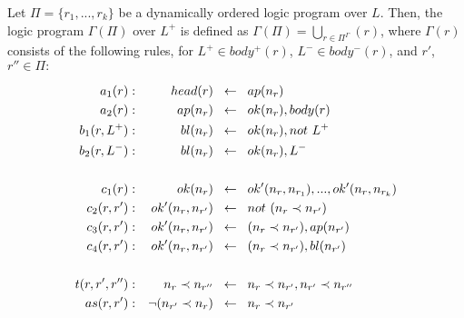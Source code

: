 \begin{definition}
  Let $\Pi = \{r_1, ..., r_k\}$ be a dynamically ordered logic program over $L$.
  Then, the logic program $\Gamma(\Pi)$ over $L^+$ is defined as
  $\Gamma(\Pi) = \bigcup_{r \in \Pi^\Gamma}(r)$, where $\Gamma(r)$ consists of the
  following rules, for $L^+ \in body^+(r)$, $L^- \in body^-(r)$, and $r'$,
  $r'' \in \Pi:$\\
\begin{minipage}{0.8\textwidth}
    \begin{align*}
      a_1(r): && head(r) \hspace*{0.2cm}&\leftarrow \hspace*{0.2cm} ap(n_r)\\
      a_2(r): && ap(n_r) \hspace*{0.2cm}&\leftarrow \hspace*{0.2cm} ok(n_r), body(r)\\
      b_1(r, L^+): && bl(n_r) \hspace*{0.2cm}&\leftarrow \hspace*{0.2cm} ok(n_r), not~L^+\\
      b_2(r, L^-): && bl(n_r) \hspace*{0.2cm}&\leftarrow \hspace*{0.2cm} ok(n_r), L^-\\
      \\
      c_1(r): && ok(n_r) \hspace*{0.2cm}&\leftarrow \hspace*{0.2cm} ok'(n_r, n_{r_1}), ..., ok'(n_r, n_{r_k})\\
      c_2(r, r'): && ok'(n_r, n_{r'}) \hspace*{0.2cm}&\leftarrow \hspace*{0.2cm} not~(n_r \prec n_{r'})\\
      c_3(r, r'): && ok'(n_r, n_{r'}) \hspace*{0.2cm}&\leftarrow \hspace*{0.2cm} (n_r \prec n_{r'}), ap(n_{r'})\\
      c_4(r, r'): && ok'(n_r, n_{r'}) \hspace*{0.2cm}&\leftarrow \hspace*{0.2cm} (n_r \prec n_{r'}), bl(n_{r'})\\
      \\
      t(r, r', r''): && n_r \prec n_{r''} \hspace*{0.2cm}&\leftarrow \hspace*{0.2cm} n_r \prec n_{r'}, n_{r'} \prec n_{r''}\\
      as(r, r'): && \neg (n_{r'} \prec n_{r}) \hspace*{0.2cm}&\leftarrow \hspace*{0.2cm} n_r \prec n_{r'}
    \end{align*}
\end{minipage}
\end{definition}


